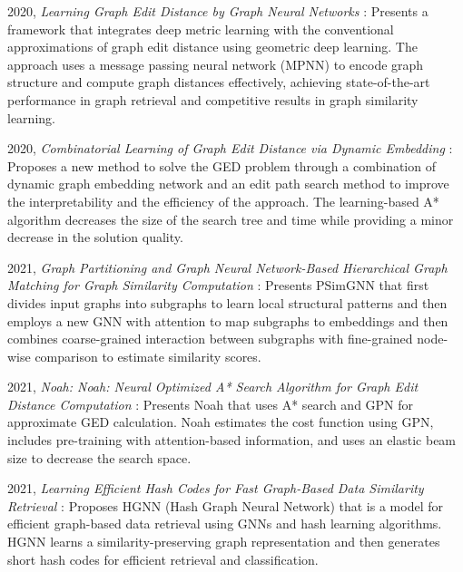 \documentclass[../Thesis.tex]{subfiles}
\begin{document}
	2020, \textit{Learning Graph Edit Distance by Graph Neural Networks} \cite{learning_graph_edit_distance_by_graph_neural_networks}: Presents a framework that integrates deep metric learning with the conventional approximations of graph edit distance using geometric deep learning. The approach uses a message passing neural network (MPNN) to encode graph structure and compute graph distances effectively, achieving state-of-the-art performance in graph retrieval and competitive results in graph similarity learning.
	
	2020, \textit{Combinatorial Learning of Graph Edit Distance via Dynamic Embedding} \cite{combinatorial_learning_of_graph_edit_distance_via_dynamic_embedding}: Proposes a new method to solve the GED problem through a combination of dynamic graph embedding network and an edit path search method to improve the interpretability and the efficiency of the approach. The learning-based A* algorithm decreases the size of the search tree and time while providing a minor decrease in the solution quality.
	
	2021, \textit{Graph Partitioning and Graph Neural Network-Based Hierarchical Graph Matching for Graph Similarity Computation} \cite{graph_partitioning_and_graph_neural_network_based_hierarchical_graph_matching_for_graph_similarity_computation}: Presents PSimGNN that first divides input graphs into subgraphs to learn local structural patterns and then employs a new GNN with attention to map subgraphs to embeddings and then combines coarse-grained interaction between subgraphs with fine-grained node-wise comparison to estimate similarity scores.
	
	2021, \textit{Noah: Noah: Neural Optimized A* Search Algorithm for Graph Edit Distance Computation} \cite{noah__neural_optimized_a*_search_algorithm_for_graph_edit_distance_computation}: Presents Noah that uses A* search and GPN for approximate GED calculation. Noah estimates the cost function using GPN, includes pre-training with attention-based information, and uses an elastic beam size to decrease the search space.
	
	2021, \textit{Learning Efficient Hash Codes for Fast Graph-Based Data Similarity Retrieval} \cite{learning_efficient_hash_codes_for_fast_graph_based_data_similarity_retrieval}: Proposes HGNN (Hash Graph Neural Network) that is a model for efficient graph-based data retrieval using GNNs and hash learning algorithms. HGNN learns a similarity-preserving graph representation and then generates short hash codes for efficient retrieval and classification.
	
\end{document}
